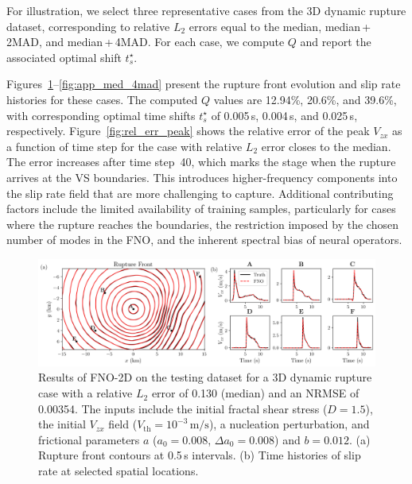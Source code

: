 \documentclass[draft]{agujournal2019}
\begin{document}
For illustration, we select three representative cases from the 3D dynamic rupture dataset, corresponding to relative \(L_2\) errors equal to the median, median\,+\,2MAD, and median\,+\,4MAD. For each case, we compute \(Q\) and report the associated optimal shift \(t_s^\star\).

Figures~\ref{fig:app_med}--\ref{fig:app_med_4mad} present the rupture front evolution and slip rate histories for these cases. The computed \(Q\) values are 12.94\%, 20.6\%, and 39.6\%, with corresponding optimal time shifts \(t_s^\star\) of 0.005\,s, 0.004\,s, and 0.025\,s, respectively. Figure~\ref{fig:rel_err_peak} shows the relative error of the peak $V_{zx}$ as a function of time step for the case with relative $L_{2}$ error closes to the median. The error increases after time step~40, which marks the stage when the rupture arrives at the VS boundaries. This introduces higher-frequency components into the slip rate field that are more challenging to capture. Additional contributing factors include the limited availability of training samples, particularly for cases where the rupture reaches the boundaries, the restriction imposed by the chosen number of modes in the FNO, and the inherent spectral bias of neural operators.



\begin{figure}
    \centering
    \includegraphics[width=1.0\linewidth]{app_med.png}
    \caption{\label{fig:app_med} Results of FNO-2D on the testing dataset for a 3D dynamic rupture case with a relative \(L_2\) error of 0.130 (median) and an NRMSE of 0.00354. The inputs include the initial fractal shear stress (\(D = 1.5\)), the initial \(V_{zx}\) field (\(V_\text{th} = 10^{-3}\,\mathrm{m/s}\)), a nucleation perturbation, and frictional parameters \(a\) (\(a_0 = 0.008\), \(\Delta a_0 = 0.008\)) and \(b = 0.012\). (a) Rupture front contours at 0.5\,s intervals. (b) Time histories of slip rate at selected spatial locations.}
\end{figure}
\end{document}
